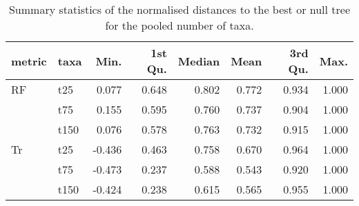 \begin{table}[ht]
\centering
\begin{tabular}{llrrrrrr}
  \hline
metric & taxa & Min. & 1st Qu. & Median & Mean & 3rd Qu. & Max. \\ 
  \hline
RF & t25 & 0.077 & 0.648 & 0.802 & 0.772 & 0.934 & 1.000 \\ 
   & t75 & 0.155 & 0.595 & 0.760 & 0.737 & 0.904 & 1.000 \\ 
   & t150 & 0.076 & 0.578 & 0.763 & 0.732 & 0.915 & 1.000 \\ 
  Tr & t25 & -0.436 & 0.463 & 0.758 & 0.670 & 0.964 & 1.000 \\ 
   & t75 & -0.473 & 0.237 & 0.588 & 0.543 & 0.920 & 1.000 \\ 
   & t150 & -0.424 & 0.238 & 0.615 & 0.565 & 0.955 & 1.000 \\ 
   \hline
\end{tabular}
\caption{Summary statistics of the normalised distances to the best or null tree for the pooled number of taxa.} 
\label{Tab_pooledtaxa}
\end{table}
